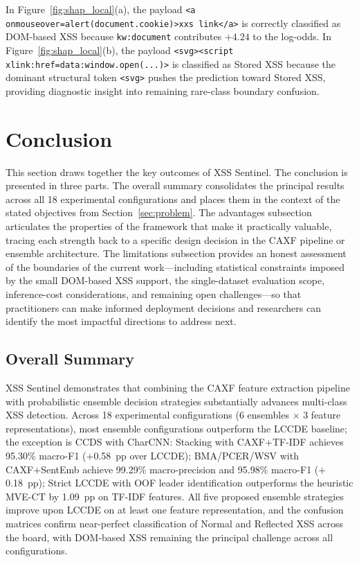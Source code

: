 \documentclass[11pt,a4paper]{article}
\begin{document}
In Figure~\ref{fig:shap_local}(a), the payload \texttt{<a onmouseover=alert(document.cookie)>xxs link</a>}
is correctly classified as DOM-based XSS because \texttt{kw:document} contributes $+4.24$ to the log-odds.
In Figure~\ref{fig:shap_local}(b), the payload \texttt{<svg><script xlink:href=data:window.open(...)>}
is classified as Stored XSS because the dominant structural token \texttt{<svg>} pushes the prediction toward Stored XSS,
providing diagnostic insight into remaining rare-class boundary confusion.

\section{Conclusion}
\label{sec:conclusion}

This section draws together the key outcomes of XSS Sentinel. The conclusion is presented in three
parts. The overall summary consolidates the principal results across all 18 experimental configurations
and places them in the context of the stated objectives from Section~\ref{sec:problem}. The advantages
subsection articulates the properties of the framework that make it practically valuable, tracing
each strength back to a specific design decision in the CAXF pipeline or ensemble architecture. The
limitations subsection provides an honest assessment of the boundaries of the current work---including
statistical constraints imposed by the small DOM-based XSS support, the single-dataset evaluation
scope, inference-cost considerations, and remaining open challenges---so that practitioners can make
informed deployment decisions and researchers can identify the most impactful directions to address next.

\subsection{Overall Summary}

XSS Sentinel demonstrates that combining the CAXF feature extraction pipeline with probabilistic
ensemble decision strategies substantially advances multi-class XSS detection. Across 18 experimental
configurations (6 ensembles $\times$ 3 feature representations), most ensemble configurations
outperform the LCCDE baseline; the exception is CCDS with CharCNN: Stacking with CAXF+TF-IDF achieves 95.30\% macro-F1 ($+$0.58~pp
over LCCDE); BMA/PCER/WSV with CAXF+SentEmb achieve 99.29\% macro-precision and 95.98\% macro-F1
($+$0.18~pp); Strict LCCDE with OOF leader identification outperforms the heuristic MVE-CT by 1.09~pp
on TF-IDF features. All five proposed ensemble strategies improve upon LCCDE on at least one feature
representation, and the confusion matrices confirm near-perfect classification of Normal and Reflected
XSS across the board, with DOM-based XSS remaining the principal challenge across all configurations.
\end{document}
